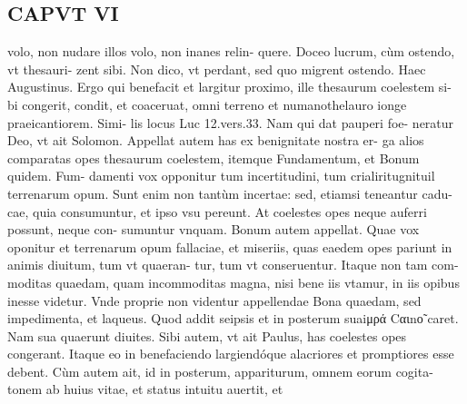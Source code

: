 \documentclass{article}
\begin{document}
\begin{pages}
\section*{CAPVT  VI }
\marginpar{[ p.5 09 ]}\pstart volo, non nudare illos volo, non inanes relin- quere. Doceo lucrum, cùm ostendo, vt thesauri- zent sibi. Non dico, vt perdant, sed quo migrent ostendo. Haec Augustinus. Ergo qui benefacit et largitur proximo, ille thesaurum coelestem si- bi congerit, condit, et coaceruat, omni terreno et numanothelauro ionge praeicantiorem. Simi- lis locus Luc 12.vers.33. Nam qui dat pauperi foe- neratur Deo, vt ait Solomon.  \pend\pstart Appellat autem has ex benignitate nostra er- ga alios comparatas opes thesaurum coelestem, itemque Fundamentum, et Bonum quidem. Fum- damenti vox opponitur tum incertitudini, tum crialiritugnituil terrenarum opum. Sunt enim non tantùm incertae: sed, etiamsi teneantur cadu- cae, quia consumuntur, et ipso vsu pereunt. At coelestes opes neque auferri possunt, neque con- sumuntur vnquam.  \pend\pstart Bonum autem appellat. Quae vox oponitur et terrenarum opum fallaciae, et miseriis, quas eaedem opes pariunt in animis diuitum, tum vt quaeran- tur, tum vt conseruentur. Itaque non tam com- moditas quaedam, quam incommoditas magna, nisi bene iis vtamur, in iis opibus inesse videtur. Vnde proprie non videntur appellendae Bona quaedam, sed impedimenta, et laqueus.  \pend\pstart Quod addit seipsis et in posterum suaiμρά Cαιnο̃ caret. Nam sua quaerunt diuites. Sibi autem, vt ait Paulus, has coelestes opes congerant. Itaque  eo in benefaciendo largiendóque alacriores et promptiores esse debent. Cùm autem ait, id in posterum, appariturum, omnem eorum cogita- tonem ab huius vitae, et status intuitu auertit, et  \pend

\end{pages}
\end{document}
